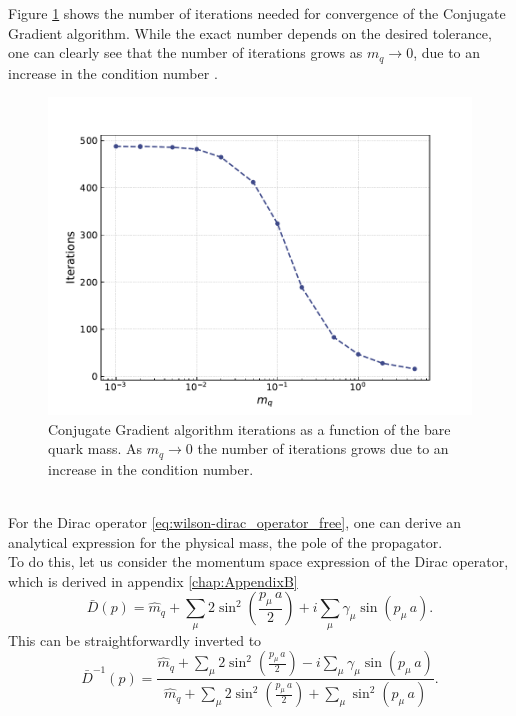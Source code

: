 Figure \ref{fig:correlator_CGiter} shows the number of iterations needed for convergence of the Conjugate Gradient algorithm. While the exact number depends on the desired tolerance, one can clearly see that the number of iterations grows as $m_q \to 0$, due to an increase in the condition number \cite{cond_num_ref}. \\
\begin{figure}[h!]
    \centering 
    \includegraphics[scale=0.6]{figures/correlator/CGiter.pdf}
    \caption[Conjugate Gradient algorithm iterations as a function of the bare quark mass.]{Conjugate Gradient algorithm iterations as a function of the bare quark mass. As $m_q \to 0$ the number of iterations grows due to an increase in the condition number.}
    \label{fig:correlator_CGiter}
\end{figure} \\
For the Dirac operator \ref{eq:wilson-dirac_operator_free}, one can derive an analytical expression for the physical mass, the pole of the propagator. \\
To do this, let us consider the momentum space expression of the Dirac operator, which is derived in appendix \ref{chap:AppendixB}
\begin{equation*}
\bar{D}(p)= \hat{m}_q + \sum_\mu 2 \sin ^2\left(\frac{p_\mu \, a}{2}\right)+i \sum_\mu \gamma_\mu \sin \left(p_\mu \, a\right).
\end{equation*}
This can be straightforwardly inverted to
\begin{equation*}
    \bar{D}^{-1}(p) = \frac{\hat{m}_q + \sum_\mu 2 \sin ^2\left(\frac{p_\mu \, a}{2}\right) - i \sum_\mu \gamma_\mu \sin \left(p_\mu \, a\right)}{\hat{m}_q + \sum_\mu 2 \sin^2\left(\frac{p_\mu \, a}{2}\right) + \sum_\mu \sin^2 \left(p_\mu \, a\right)}.
\end{equation*}
